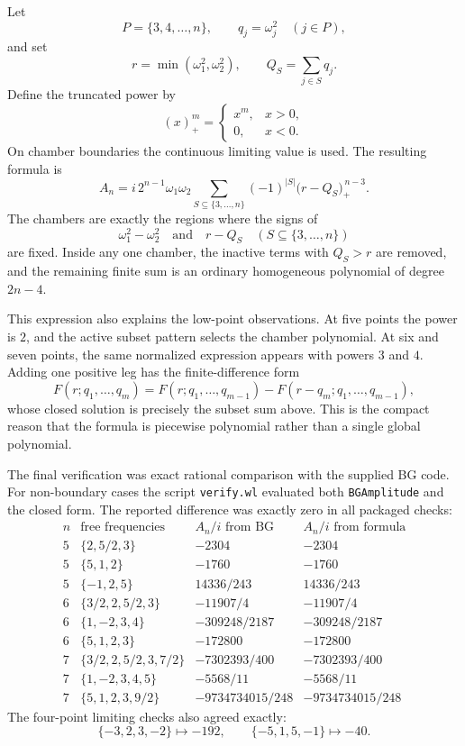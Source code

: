\documentclass[11pt]{article}
\begin{document}
Let
\[
    P=\{3,4,\ldots,n\},\qquad
    q_j=\omega_j^2\quad(j\in P),
\]
and set
\[
    r=\min(\omega_1^2,\omega_2^2),
    \qquad
    Q_S=\sum_{j\in S}q_j.
\]
Define the truncated power by
\[
    (x)_+^m=
    \begin{cases}
    x^m, & x>0,\\
    0, & x<0.
    \end{cases}
\]
On chamber boundaries the continuous limiting value is used. The resulting
formula is
\[
    A_n
    =
    i\,2^{n-1}\omega_1\omega_2
    \sum_{S\subseteq\{3,\ldots,n\}}
       (-1)^{|S|}\bigl(r-Q_S\bigr)_+^{\,n-3}.
\]
The chambers are exactly the regions where the signs of
\[
    \omega_1^2-\omega_2^2
    \quad\text{and}\quad
    r-Q_S\quad(S\subseteq\{3,\ldots,n\})
\]
are fixed. Inside any one chamber, the inactive terms with \(Q_S>r\) are
removed, and the remaining finite sum is an ordinary homogeneous polynomial of
degree \(2n-4\).

This expression also explains the low-point observations. At five points the
power is \(2\), and the active subset pattern selects the chamber polynomial.
At six and seven points, the same normalized expression appears with powers
\(3\) and \(4\). Adding one positive leg has the finite-difference form
\[
    F(r;q_1,\ldots,q_m)
    =
    F(r;q_1,\ldots,q_{m-1})
    -
    F(r-q_m;q_1,\ldots,q_{m-1}),
\]
whose closed solution is precisely the subset sum above. This is the compact
reason that the formula is piecewise polynomial rather than a single global
polynomial.

The final verification was exact rational comparison with the supplied BG code.
For non-boundary cases the script \texttt{verify.wl} evaluated both
\texttt{BGAmplitude} and the closed form. The reported difference was exactly
zero in all packaged checks:
\[
\begin{array}{c|c|c|c}
n & \text{free frequencies} & A_n/i\text{ from BG} & A_n/i\text{ from formula}\\
\hline
5 & \{2,5/2,3\} & -2304 & -2304\\
5 & \{5,1,2\} & -1760 & -1760\\
5 & \{-1,2,5\} & 14336/243 & 14336/243\\
6 & \{3/2,2,5/2,3\} & -11907/4 & -11907/4\\
6 & \{1,-2,3,4\} & -309248/2187 & -309248/2187\\
6 & \{5,1,2,3\} & -172800 & -172800\\
7 & \{3/2,2,5/2,3,7/2\} & -7302393/400 & -7302393/400\\
7 & \{1,-2,3,4,5\} & -5568/11 & -5568/11\\
7 & \{5,1,2,3,9/2\} & -9734734015/248 & -9734734015/248
\end{array}
\]
The four-point limiting checks also agreed exactly:
\[
    \{-3,2,3,-2\}\mapsto -192,
    \qquad
    \{-5,1,5,-1\}\mapsto -40.
\]
\end{document}

